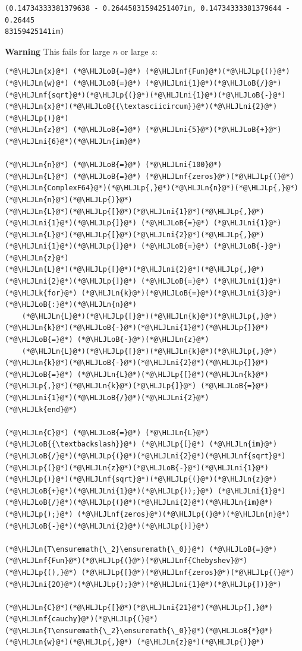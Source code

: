 \documentclass[12pt,a4paper]{article}
\newcommand{\HLJLk}[1]{\textcolor[RGB]{148,91,176}{\textbf{#1}}}
\newcommand{\HLJLn}[1]{#1}
\newcommand{\HLJLnf}[1]{\textcolor[RGB]{66,102,213}{#1}}
\newcommand{\HLJLni}[1]{\textcolor[RGB]{59,151,46}{#1}}
\newcommand{\HLJLoB}[1]{\textcolor[RGB]{102,102,102}{\textbf{#1}}}
\newcommand{\HLJLp}[1]{#1}
\begin{document}
\begin{lstlisting}
(0.14734333381379638 - 0.26445831594251407im, 0.14734333381379644 - 0.26445
83159425141im)
\end{lstlisting}


\textbf{Warning} This fails for large $n$ or large $z$:


\begin{lstlisting}
(*@\HLJLn{x}@*) (*@\HLJLoB{=}@*) (*@\HLJLnf{Fun}@*)(*@\HLJLp{()}@*)
(*@\HLJLn{w}@*) (*@\HLJLoB{=}@*) (*@\HLJLni{1}@*)(*@\HLJLoB{/}@*)(*@\HLJLnf{sqrt}@*)(*@\HLJLp{(}@*)(*@\HLJLni{1}@*)(*@\HLJLoB{-}@*)(*@\HLJLn{x}@*)(*@\HLJLoB{{\textasciicircum}}@*)(*@\HLJLni{2}@*)(*@\HLJLp{)}@*)
(*@\HLJLn{z}@*) (*@\HLJLoB{=}@*) (*@\HLJLni{5}@*)(*@\HLJLoB{+}@*)(*@\HLJLni{6}@*)(*@\HLJLn{im}@*)

(*@\HLJLn{n}@*) (*@\HLJLoB{=}@*) (*@\HLJLni{100}@*)
(*@\HLJLn{L}@*) (*@\HLJLoB{=}@*) (*@\HLJLnf{zeros}@*)(*@\HLJLp{(}@*)(*@\HLJLn{ComplexF64}@*)(*@\HLJLp{,}@*)(*@\HLJLn{n}@*)(*@\HLJLp{,}@*)(*@\HLJLn{n}@*)(*@\HLJLp{)}@*)
(*@\HLJLn{L}@*)(*@\HLJLp{[}@*)(*@\HLJLni{1}@*)(*@\HLJLp{,}@*)(*@\HLJLni{1}@*)(*@\HLJLp{]}@*) (*@\HLJLoB{=}@*) (*@\HLJLni{1}@*)
(*@\HLJLn{L}@*)(*@\HLJLp{[}@*)(*@\HLJLni{2}@*)(*@\HLJLp{,}@*)(*@\HLJLni{1}@*)(*@\HLJLp{]}@*) (*@\HLJLoB{=}@*) (*@\HLJLoB{-}@*)(*@\HLJLn{z}@*)
(*@\HLJLn{L}@*)(*@\HLJLp{[}@*)(*@\HLJLni{2}@*)(*@\HLJLp{,}@*)(*@\HLJLni{2}@*)(*@\HLJLp{]}@*) (*@\HLJLoB{=}@*) (*@\HLJLni{1}@*)
(*@\HLJLk{for}@*) (*@\HLJLn{k}@*)(*@\HLJLoB{=}@*)(*@\HLJLni{3}@*)(*@\HLJLoB{:}@*)(*@\HLJLn{n}@*)
    (*@\HLJLn{L}@*)(*@\HLJLp{[}@*)(*@\HLJLn{k}@*)(*@\HLJLp{,}@*)(*@\HLJLn{k}@*)(*@\HLJLoB{-}@*)(*@\HLJLni{1}@*)(*@\HLJLp{]}@*) (*@\HLJLoB{=}@*) (*@\HLJLoB{-}@*)(*@\HLJLn{z}@*)
    (*@\HLJLn{L}@*)(*@\HLJLp{[}@*)(*@\HLJLn{k}@*)(*@\HLJLp{,}@*)(*@\HLJLn{k}@*)(*@\HLJLoB{-}@*)(*@\HLJLni{2}@*)(*@\HLJLp{]}@*) (*@\HLJLoB{=}@*) (*@\HLJLn{L}@*)(*@\HLJLp{[}@*)(*@\HLJLn{k}@*)(*@\HLJLp{,}@*)(*@\HLJLn{k}@*)(*@\HLJLp{]}@*) (*@\HLJLoB{=}@*) (*@\HLJLni{1}@*)(*@\HLJLoB{/}@*)(*@\HLJLni{2}@*)
(*@\HLJLk{end}@*)

(*@\HLJLn{C}@*) (*@\HLJLoB{=}@*) (*@\HLJLn{L}@*) (*@\HLJLoB{{\textbackslash}}@*) (*@\HLJLp{[}@*) (*@\HLJLn{im}@*)(*@\HLJLoB{/}@*)(*@\HLJLp{(}@*)(*@\HLJLni{2}@*)(*@\HLJLnf{sqrt}@*)(*@\HLJLp{(}@*)(*@\HLJLn{z}@*)(*@\HLJLoB{-}@*)(*@\HLJLni{1}@*)(*@\HLJLp{)}@*)(*@\HLJLnf{sqrt}@*)(*@\HLJLp{(}@*)(*@\HLJLn{z}@*)(*@\HLJLoB{+}@*)(*@\HLJLni{1}@*)(*@\HLJLp{));}@*) (*@\HLJLni{1}@*)(*@\HLJLoB{/}@*)(*@\HLJLp{(}@*)(*@\HLJLni{2}@*)(*@\HLJLn{im}@*)(*@\HLJLp{);}@*) (*@\HLJLnf{zeros}@*)(*@\HLJLp{(}@*)(*@\HLJLn{n}@*)(*@\HLJLoB{-}@*)(*@\HLJLni{2}@*)(*@\HLJLp{)]}@*)

(*@\HLJLn{T\ensuremath{\_2}\ensuremath{\_0}}@*) (*@\HLJLoB{=}@*) (*@\HLJLnf{Fun}@*)(*@\HLJLp{(}@*)(*@\HLJLnf{Chebyshev}@*)(*@\HLJLp{(),}@*) (*@\HLJLp{[}@*)(*@\HLJLnf{zeros}@*)(*@\HLJLp{(}@*)(*@\HLJLni{20}@*)(*@\HLJLp{);}@*)(*@\HLJLni{1}@*)(*@\HLJLp{])}@*)

(*@\HLJLn{C}@*)(*@\HLJLp{[}@*)(*@\HLJLni{21}@*)(*@\HLJLp{],}@*) (*@\HLJLnf{cauchy}@*)(*@\HLJLp{(}@*)(*@\HLJLn{T\ensuremath{\_2}\ensuremath{\_0}}@*)(*@\HLJLoB{*}@*)(*@\HLJLn{w}@*)(*@\HLJLp{,}@*) (*@\HLJLn{z}@*)(*@\HLJLp{)}@*)
\end{lstlisting}
\end{document}
